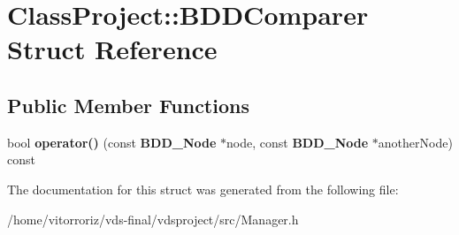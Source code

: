 \section{Class\+Project\+:\+:B\+D\+D\+Comparer Struct Reference}
\label{structClassProject_1_1BDDComparer}
\subsection*{Public Member Functions}
\begin{DoxyCompactItemize}
\item 
bool {\bfseries operator()} (const {\bf B\+D\+D\+\_\+\+Node} $\ast$node, const {\bf B\+D\+D\+\_\+\+Node} $\ast$another\+Node) const \label{structClassProject_1_1BDDComparer_a3b6ed8b57cf25205718a1a2509587b0e}

\end{DoxyCompactItemize}


The documentation for this struct was generated from the following file\+:\begin{DoxyCompactItemize}
\item 
/home/vitorroriz/vds-\/final/vdsproject/src/Manager.\+h\end{DoxyCompactItemize}

